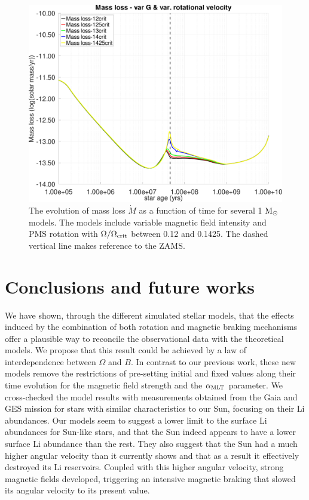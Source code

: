 \documentclass[fleqn,usenatbib]{mnras}
\begin{document}
\begin{figure}
	\includegraphics[clip,width=\columnwidth]{figures/paper2/mdot_var_vel_g3.pdf}
    \caption{The evolution of mass loss $\Dot{M}$ as a function of time for several 1 $\mathrm{M}_\odot$ models. The models include variable magnetic field intensity and PMS rotation with $\Omega / \Omega_{\mathrm{crit}}$ between 0.12 and 0.1425. The dashed vertical line makes reference to the ZAMS.}
    \label{fig:mdot_var_vel_g3}
\end{figure}

\section{Conclusions and future works} \label{sec_conclusions}
We have shown, through the different simulated stellar models, that the effects induced by the combination of both rotation and magnetic braking mechanisms offer a plausible way to reconcile the observational data with the theoretical models. We propose that this result could be achieved by a law of interdependence between $\Omega$ and $B$. In contrast to our previous work, these new models remove the restrictions of pre-setting initial and fixed values along their time evolution for the magnetic field strength and the $\alpha_{\mathrm{MLT}}$ parameter. We cross-checked the model results with measurements obtained from the Gaia and GES mission for stars with similar characteristics to our Sun, focusing on their Li abundances. Our models seem to suggest a lower limit to the surface Li abundances for Sun-like stars, and that the Sun indeed appears to have a lower surface Li abundance than the rest. They also suggest that the Sun had a much higher angular velocity than it currently shows and that as a result it effectively destroyed its Li reservoirs. Coupled with this higher angular velocity, strong magnetic fields developed, triggering an intensive magnetic braking that slowed its angular velocity to its present value.\par
\end{document}
